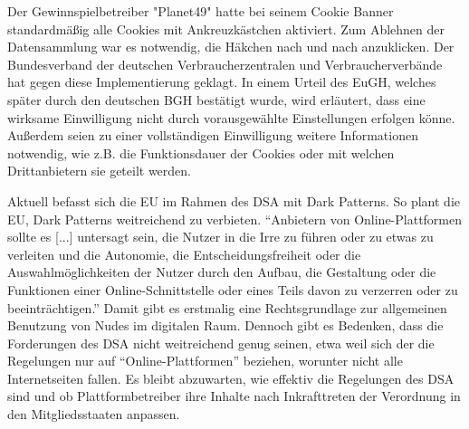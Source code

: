Der Gewinnspielbetreiber "Planet49" hatte bei seinem Cookie Banner standardmäßig alle Cookies mit Ankreuzkästchen aktiviert. Zum Ablehnen der Datensammlung war es notwendig, die Häkchen nach und nach anzuklicken. Der Bundesverband der deutschen Verbraucherzentralen und Verbraucherverbände hat gegen diese Implementierung geklagt. In einem Urteil des \ac{EuGH}, welches später durch den deutschen \ac{BGH} bestätigt wurde, wird erläutert, dass eine wirksame Einwilligung nicht durch vorausgewählte Einstellungen erfolgen könne. Außerdem seien zu einer vollständigen Einwilligung weitere Informationen notwendig, wie z.B. die Funktionsdauer der Cookies oder mit welchen Drittanbietern sie geteilt werden. \parencite{Hartung.2020}

Aktuell befasst sich die \ac{EU} im Rahmen des \ac{DSA} mit Dark Patterns. So plant die \ac{EU}, Dark Patterns weitreichend zu verbieten. ``Anbietern von Online-Plattformen sollte es [...] untersagt sein, die Nutzer in die Irre zu führen oder zu etwas zu verleiten und die Autonomie, die Entscheidungsfreiheit oder die Auswahlmöglichkeiten der Nutzer durch den Aufbau, die Gestaltung oder die Funktionen einer Online-Schnittstelle oder eines Teils davon zu verzerren oder zu beeinträchtigen.'' \parencite[S. 18]{EuropaischeUnion.2022} Damit gibt es erstmalig eine Rechtsgrundlage zur allgemeinen Benutzung von Nudes im digitalen Raum. Dennoch gibt es Bedenken, dass die Forderungen des \ac{DSA} nicht weitreichend genug seinen, etwa weil sich der die Regelungen nur auf ``Online-Plattformen'' beziehen, worunter nicht alle Internetseiten fallen. \parencite{King.2022} Es bleibt abzuwarten, wie effektiv die Regelungen des \ac{DSA} sind und ob Plattformbetreiber ihre Inhalte nach Inkrafttreten der Verordnung in den Mitgliedsstaaten anpassen.